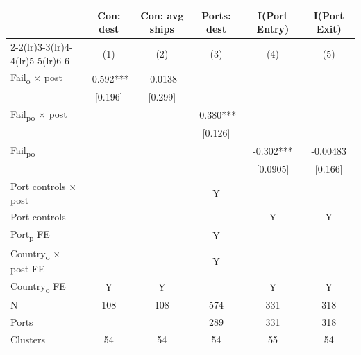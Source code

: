{
\def\sym#1{\ifmmode^{#1}\else\(^{#1}\)\fi}
\begin{tabular}{l*{5}{c}}
\toprule
            &\multicolumn{1}{c}{Con: dest}&\multicolumn{1}{c}{Con: avg ships}&\multicolumn{1}{c}{Ports: dest}&\multicolumn{1}{c}{I(Port Entry)}&\multicolumn{1}{c}{I(Port Exit)}\\\cmidrule(lr){2-2}\cmidrule(lr){3-3}\cmidrule(lr){4-4}\cmidrule(lr){5-5}\cmidrule(lr){6-6}
            &\multicolumn{1}{c}{(1)}   &\multicolumn{1}{c}{(2)}   &\multicolumn{1}{c}{(3)}   &\multicolumn{1}{c}{(4)}   &\multicolumn{1}{c}{(5)}   \\
\midrule
Fail\textsubscript{o} $\times$ post&      -0.592***&     -0.0138   &               &               &               \\
            &     [0.196]   &     [0.299]   &               &               &               \\
Fail\textsubscript{po} $\times$ post&               &               &      -0.380***&               &               \\
            &               &               &     [0.126]   &               &               \\
Fail\textsubscript{po}&               &               &               &      -0.302***&    -0.00483   \\
            &               &               &               &    [0.0905]   &     [0.166]   \\
Port controls $\times$ post &               &               &           Y   &               &               \\
Port controls &               &               &               &           Y   &           Y   \\
Port\textsubscript{p} FE &               &               &           Y   &               &               \\
Country\textsubscript{o} $\times$ post FE&               &               &           Y   &               &               \\
Country\textsubscript{o} FE&           Y   &           Y   &               &           Y   &           Y   \\
\midrule
N           &         108   &         108   &         574   &         331   &         318   \\
Ports       &               &               &         289   &         331   &         318   \\
Clusters    &          54   &          54   &          54   &          55   &          54   \\
\bottomrule
\end{tabular}
}
